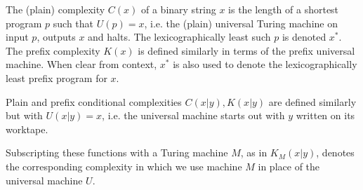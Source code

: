 \documentclass[12pt]{article}
\begin{document}
The (plain) complexity $C(x)$ of a binary string $x$ is the length of a shortest
program $p$ such that $U(p)=x$, i.e. the (plain) universal Turing machine on
input $p$, outputs $x$ and halts. The lexicographically least such $p$ is
denoted $x^{\ast}$.
The prefix complexity $K(x)$ is defined similarly in terms of the prefix universal
machine. When clear from context, $x^{\ast}$ is also used to denote the
lexicographically least prefix program for $x$.

Plain and prefix conditional complexities $C(x|y), K(x|y)$ are defined similarly
but with $U(x|y)=x$, i.e. the universal machine starts out with $y$ written
on its worktape.

Subscripting these functions with a Turing machine $M$, as in
$K_M(x|y)$, denotes the corresponding complexity in which we use machine $M$
in place of the universal machine $U$.
\end{document}

